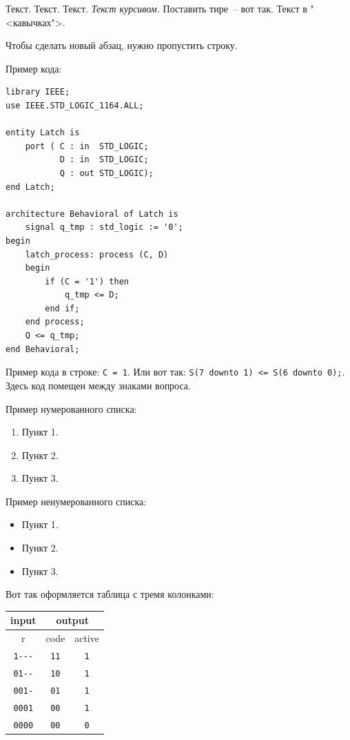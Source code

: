Текст. Текст. Текст. \emph{Текст курсивом.} Поставить тире~-- вот так. Текст в "<кавычках">.

Чтобы сделать новый абзац, нужно пропустить строку.

Пример кода:

\begin{Code}
\begin{lstlisting}
library IEEE;
use IEEE.STD_LOGIC_1164.ALL;

entity Latch is
    port ( C : in  STD_LOGIC;
           D : in  STD_LOGIC;
           Q : out STD_LOGIC);
end Latch;

architecture Behavioral of Latch is
    signal q_tmp : std_logic := '0';
begin
    latch_process: process (C, D)
    begin
        if (C = '1') then
            q_tmp <= D;
        end if;
    end process;
    Q <= q_tmp;
end Behavioral;
\end{lstlisting}
\end{Code}

Пример кода в строке: \lstinline?С = 1?. Или вот так: \lstinline?S(7 downto 1) <= S(6 downto 0);?. Здесь код помещен между знаками вопроса.

Пример нумерованного списка:

\begin{enumerate}
\item Пункт 1.
\item Пункт 2.
\item Пункт 3.
\end{enumerate}

Пример ненумерованного списка:

\begin{itemize}
\item Пункт 1.
\item Пункт 2.
\item Пункт 3.
\end{itemize}

Вот так оформляется таблица с тремя колонками:

\begin{table}[h]
\centering
\begin{tabular}{|c|c|c|}
\hline
input               & \multicolumn{2}{c|}{output} \\ \hline
r                   & code        & active         \\ \hline
\texttt{1{-}{-}{-}} & \texttt{11} & \texttt{1}     \\
\texttt{01{-}{-}}   & \texttt{10} & \texttt{1}     \\
\texttt{001-}       & \texttt{01} & \texttt{1}     \\
\texttt{0001}       & \texttt{00} & \texttt{1}     \\
\texttt{0000}       & \texttt{00} & \texttt{0}     \\
\hline
\end{tabular}
\end{table}

